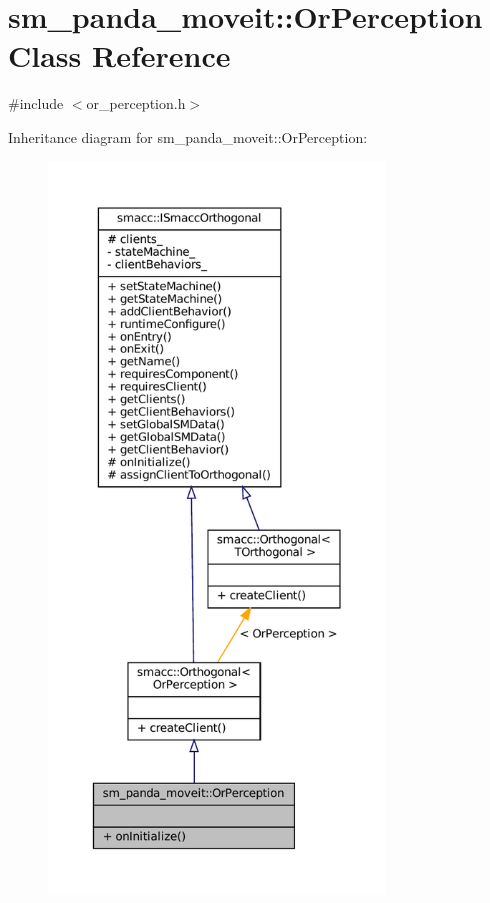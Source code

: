 \hypertarget{classsm__panda__moveit_1_1OrPerception}{}\section{sm\+\_\+panda\+\_\+moveit\+:\+:Or\+Perception Class Reference}
\label{classsm__panda__moveit_1_1OrPerception}


{\ttfamily \#include $<$or\+\_\+perception.\+h$>$}



Inheritance diagram for sm\+\_\+panda\+\_\+moveit\+:\+:Or\+Perception\+:
\nopagebreak
\begin{figure}[H]
\begin{center}
\leavevmode
\includegraphics[height=550pt]{classsm__panda__moveit_1_1OrPerception__inherit__graph}
\end{center}
\end{figure}


